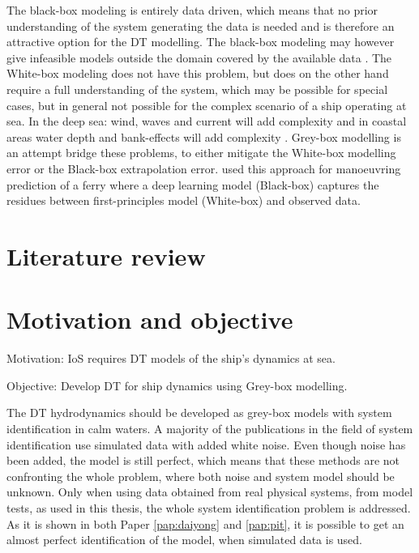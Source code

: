 \noindent The black-box modeling is entirely data driven, which means that no prior understanding of the system generating the data is needed and is therefore an attractive option for the DT modelling. The black-box modeling may however give infeasible models outside the domain covered by the available data \cite{nielsen_machine_2022}. The White-box modeling does not have this problem, but does on the other hand require a full understanding of the system, which may be possible for special cases, but in general not possible for the complex scenario of a ship operating at sea. In the deep sea: wind, waves and current will add complexity and in coastal areas water depth and bank-effects will add complexity \cite{nielsen_machine_2022}. 
\noindent Grey-box modelling is an attempt bridge these problems, to either mitigate the White-box modelling error or the Black-box extrapolation error. \cite{nielsen_machine_2022} used this approach for manoeuvring prediction of a ferry where a deep learning model (Black-box) captures the residues between first-principles model (White-box) and observed data.


\section{Literature review}


\section{Motivation and objective}
\label{sec:motivation}
Motivation: IoS requires DT models of the ship's dynamics at sea.

Objective: Develop DT for ship dynamics using Grey-box modelling.


The DT hydrodynamics should be developed as grey-box models with system identification in calm waters. A majority of the publications in the field of system identification use simulated data with added white noise. Even though noise has been added, the model is still perfect, which means that these methods are not confronting the whole problem, where both noise and system model should be unknown. 
Only when using data obtained from real physical systems, from model tests, as used in this thesis, the whole system identification problem is addressed.
As it is shown in both Paper \ref{pap:daiyong} and \ref{pap:pit}, it is possible to get an almost perfect identification of the model, when simulated data is used.

